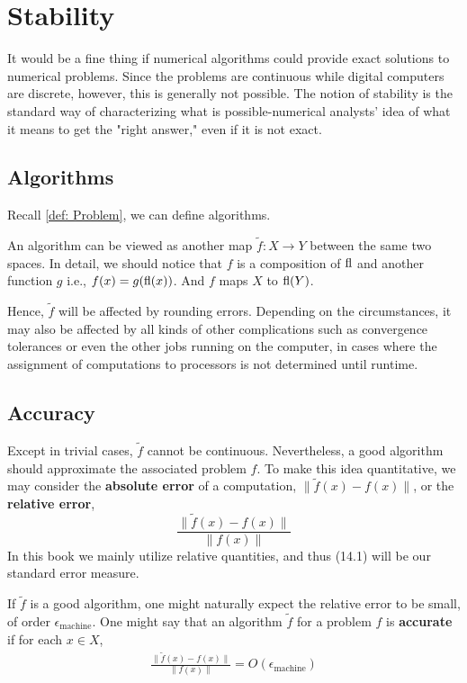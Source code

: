 \chapter{Stability} 
It would be a fine thing if numerical algorithms could provide exact solutions to numerical problems. Since the problems are continuous while digital computers are discrete, however, this is generally not possible. The notion of stability is the standard way of characterizing what is possible-numerical analysts' idea of what it means to get the "right answer," even if it is not exact.

\section{Algorithms} 
Recall \autoref{def: Problem}, we can define algorithms. 

\begin{definition}
[Algorithm]
\label{def: Algorithm}
An algorithm can be viewed as another map $\tilde{f}: X \rightarrow Y$ between the same two spaces. In detail, we should notice that $f$ is a composition of $\operatorname{fl}$ and another function $g$ i.e., $f(x) = g(\operatorname{fl}(x))$. And $f$ maps $X$ to $\operatorname{fl}(Y)$. 
\end{definition}

Hence, $\tilde f$ will be affected by rounding errors. Depending on the circumstances, it may also be affected by all kinds of other complications such as convergence tolerances or even the other jobs running on the computer, in cases where the assignment of computations to processors is not determined until runtime.

\section{Accuracy} 
Except in trivial cases, $\tilde{f}$ cannot be continuous. Nevertheless, a good algorithm should approximate the associated problem $f$. To make this idea quantitative, we may consider the \textbf{absolute error} of a computation, $\|\tilde{f}(x)-f(x)\|$, or the \textbf{relative error},
\begin{equation}
    \label{eq: relative error}
    \frac{\|\tilde{f}(x)-f(x)\|}{\|f(x)\|}
\end{equation}
In this book we mainly utilize relative quantities, and thus (14.1) will be our standard error measure.

If $\tilde{f}$ is a good algorithm, one might naturally expect the relative error to be small, of order $\epsilon_{\text {machine}}$. One might say that an algorithm $\tilde{f}$ for a problem $f$ is \textbf{accurate} if for each $x \in X$,
\begin{align}
    \label{eq: accurate}
\frac{\|\tilde{f}(x)-f(x)\|}{\|f(x)\|}=O\left(\epsilon_{\text {machine}}\right)
\end{align}

